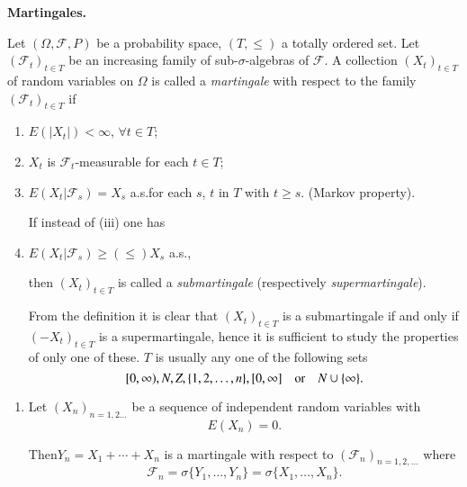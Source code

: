 \medskip
\noindent
{\bf Martingales.}\pageoriginale
\smallskip


\begin{defi*}
Let $(\Omega,\mathscr{F},P)$ be a probability space, $(T,\leq)$ a
totally ordered set. Let $(\mathscr{F}_{t})_{t\in T}$ be an increasing
family of sub-$\sigma$-algebras of $\mathscr{F}$. A collection
$(X_{t})_{t\in T}$ of random variables on $\Omega$ is called a {\em
  martingale} with respect to the family $(\mathscr{F}_{t})_{t\in T}$
if
\begin{enumerate}
\renewcommand{\theenumi}{\roman{enumi}}
\renewcommand{\labelenumi}{(\theenumi)}
\item $E(|X_{t}|)<\infty$, $\forall t\in T$;

\item $X_{t}$ is $\mathscr{F}_{t}$-measurable for each $t\in T$;

\item $E(X_{t}|\mathscr{F}_{s})=X_{s}$ a.s.\@ for each $s$, $t$ in $T$
  with $t\geq s$. (Markov property).

If instead of (iii) one has

\setcounter{enumi}{2}
\renewcommand{\labelenumi}{(\theenumi)$'$}
\item $E(X_{t}|\mathscr{F}_{s})\geq (\leq)X_{s}$ a.s.,

then $(X_{t})_{t\in T}$ is called a {\em submartingale} (respectively
{\em supermartingale}). 

From the definition it is clear that $(X_{t})_{t\in T}$ is a
submartingale if and only if $(-X_{t})_{t\in T}$ is a supermartingale,
hence it is sufficient to study the properties of only one of
these. $T$ is usually any one of the following sets
$$
[0,\infty), N,Z,\{1,2,\ldots,n\}, [0,\infty]\quad\text{or}\quad N\cup \{\infty\}.
$$
\end{enumerate}
\end{defi*}

\begin{examples*}
\begin{enumerate}
\renewcommand{\labelenumi}{(\theenumi)}
\item Let $(X_{n})_{n=1,2\ldots}$ be a sequence of independent random
  variables with
$$
E(X_{n})=0.
$$

Then\pageoriginale $Y_{n}=X_{1}+\cdots+X_{n}$ is a martingale with
respect to $(\mathscr{F}_{n})_{n=1,2,\ldots}$ where
$$
\mathscr{F}_{n}=\sigma\{Y_{1},\ldots,Y_{n}\}=\sigma\{X_{1},\ldots,X_{n}\}.
$$
\end{enumerate}
\end{examples*}

